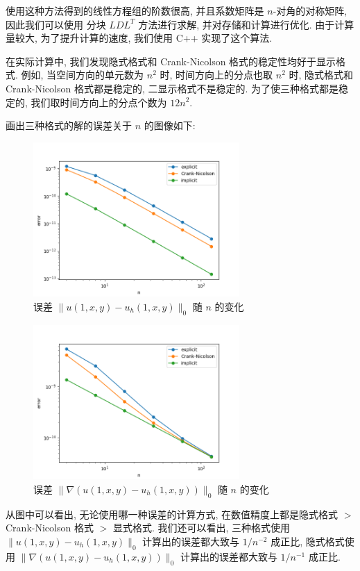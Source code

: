 \documentclass[UTF8]{article}
\begin{document}
    使用这种方法得到的线性方程组的阶数很高, 并且系数矩阵是 $n$-对角的对称矩阵, 因此我们可以使用 分块 $LDL^T$ 方法进行求解, 并对存储和计算进行优化.
    由于计算量较大, 为了提升计算的速度, 我们使用 C++ 实现了这个算法.

    在实际计算中, 我们发现隐式格式和 Crank-Nicolson 格式的稳定性均好于显示格式.
    例如, 当空间方向的单元数为 $n^2$ 时, 时间方向上的分点也取 $n^2$ 时, 隐式格式和 Crank-Nicolson 格式都是稳定的, 二显示格式不是稳定的.
    为了使三种格式都是稳定的, 我们取时间方向上的分点个数为 $12n^2$.

    画出三种格式的解的误差关于 $n$ 的图像如下:

    \begin{figure}[h]
        \centering
        \caption{误差 $\|u(1,x,y)-u_h(1,x,y)\|_0$ 随 $n$ 的变化}
        \includegraphics[width=0.7\textwidth]{./assets/L2_error}
    \end{figure}

    \begin{figure}[h]
        \centering
        \caption{误差 $\|\nabla(u(1,x,y)-u_h(1,x,y))\|_0$ 随 $n$ 的变化}
        \includegraphics[width=0.7\textwidth]{./assets/H1_error}
    \end{figure}

    从图中可以看出, 无论使用哪一种误差的计算方式, 在数值精度上都是隐式格式 $>$ Crank-Nicolson 格式 $>$ 显式格式.
    我们还可以看出, 三种格式使用 $\|u(1,x,y)-u_h(1,x,y)\|_0$ 计算出的误差都大致与 $1/n^{-2}$ 成正比, 隐式格式使用 $\|\nabla(u(1,x,y)-u_h(1,x,y))\|_0$ 计算出的误差都大致与 $1/n^{-1}$ 成正比.
\end{document}
